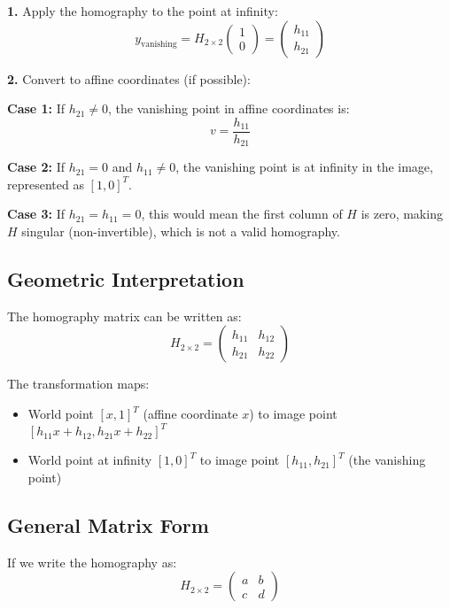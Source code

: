 \documentclass[12pt]{article}
\begin{document}
\textbf{1.} Apply the homography to the point at infinity:
\[
y_{\text{vanishing}} = H_{2 \times 2} \begin{pmatrix} 1 \\ 0 \end{pmatrix} = \begin{pmatrix} h_{11} \\ h_{21} \end{pmatrix}
\]

\textbf{2.} Convert to affine coordinates (if possible):

\textbf{Case 1:} If $h_{21} \neq 0$, the vanishing point in affine coordinates is:
\[
\boxed{v = \frac{h_{11}}{h_{21}}}
\]

\textbf{Case 2:} If $h_{21} = 0$ and $h_{11} \neq 0$, the vanishing point is at infinity in the image, represented as $[1, 0]^T$.

\textbf{Case 3:} If $h_{21} = h_{11} = 0$, this would mean the first column of $H$ is zero, making $H$ singular (non-invertible), which is not a valid homography.

\subsection*{Geometric Interpretation}

The homography matrix can be written as:
\[
H_{2 \times 2} = \begin{pmatrix} h_{11} & h_{12} \\ h_{21} & h_{22} \end{pmatrix}
\]

The transformation maps:
\begin{itemize}
    \item World point $[x, 1]^T$ (affine coordinate $x$) to image point $[h_{11}x + h_{12}, h_{21}x + h_{22}]^T$
    \item World point at infinity $[1, 0]^T$ to image point $[h_{11}, h_{21}]^T$ (the vanishing point)
\end{itemize}

\subsection*{General Matrix Form}

If we write the homography as:
\[
H_{2 \times 2} = \begin{pmatrix} a & b \\ c & d \end{pmatrix}
\]
\end{document}
